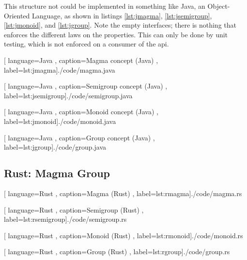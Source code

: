 This structure not could be implemented in something like Java, an
Object-Oriented Language, as shown in listings \ref{lst:jmagma},
\ref{lst:jsemigroup}, \ref{lst:jmonoid}, and \ref{lst:jgroup}. Note the empty
interfaces; there is nothing that enforces the different laws on the properties.
This can only be done by unit testing, which is not enforced on a consumer of
the \gls{api}.

\begin{center}
  
    [ language=Java
    , caption={Magma concept (Java)}
    , label=lst:jmagma]{./code/magma.java}
\end{center}

\begin{center}
  
    [ language=Java
    , caption={Semigroup concept (Java)}
    , label=lst:jsemigroup]{./code/semigroup.java}
\end{center}

\begin{center}
  
    [ language=Java
    , caption={Monoid concept (Java)}
    , label=lst:jmonoid]{./code/monoid.java}
\end{center}

\begin{center}
  
    [ language=Java
    , caption={Group concept (Java)}
    , label=lst:jgroup]{./code/group.java}
\end{center}

\subsection{Rust: Magma \to Group}


\begin{center}
  
    [ language=Rust
    , caption={Magma (Rust)}
    , label=lst:rmagma]{./code/magma.rs}
\end{center}

\begin{center}
  
    [ language=Rust
    , caption={Semigroup (Rust)}
    , label=lst:rsemigroup]{./code/semigroup.rs}
\end{center}

\begin{center}
  
    [ language=Rust
    , caption={Monoid (Rust)}
    , label=lst:rmonoid]{./code/monoid.rs}
\end{center}

\begin{center}
  
    [ language=Rust
    , caption={Group (Rust)}
    , label=lst:rgroup]{./code/group.rs}
\end{center}

